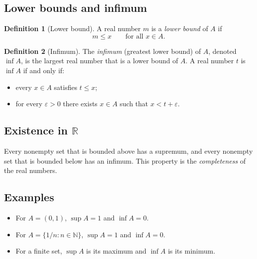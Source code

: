 \documentclass[11pt,a4paper]{article}
\theoremstyle{definition} \newtheorem{definition}{Definition} \theoremstyle{plain} \newtheorem{theorem}{Theorem}
\begin{document}
\subsection{Lower bounds and infimum}
\begin{definition}[Lower bound] A real number $m$ is a \emph{lower bound} of $A$ if
\[ m \le x \qquad \text{for all } x\in A. \]
\end{definition}
\begin{definition}[Infimum] The \emph{infimum} (greatest lower bound) of $A$, denoted $\inf A$, is the largest real number that is a lower bound of $A$.
A real number $t$ is $\inf A$ if and only if:
\begin{itemize}
\item every $x\in A$ satisfies $t\le x$;
\item for every $\varepsilon>0$ there exists $x\in A$ such that $x < t+\varepsilon$. \end{itemize}
\end{definition}
\subsection{Existence in \texorpdfstring{$\mathbb{R}$}{R}}
Every nonempty set that is bounded above has a supremum, and every nonempty set that is bounded below has an infimum. This property is the \emph{completeness} of the real numbers.
\subsection*{Examples}
\begin{itemize}
\item For $A=(0,1)$, $\sup A=1$ and $\inf A=0$.
\item For $A=\{1/n : n\in\mathbb{N}\}$, $\sup A=1$ and $\inf A=0$.
\item For a finite set, $\sup A$ is its maximum and $\inf A$ is its minimum. \end{itemize}
\end{document}
